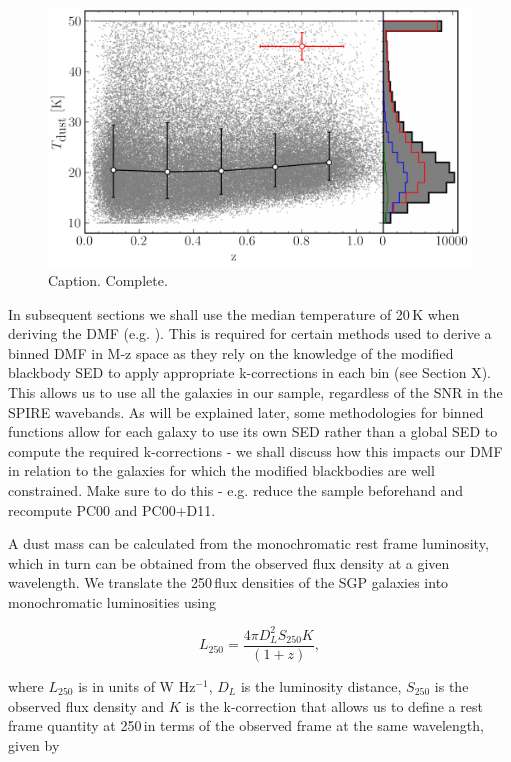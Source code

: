 \begin{figure}
	\centering
	\includegraphics[width=0.9\columnwidth]{Figures/dust_temperatures.pdf}
	\caption{Caption. {\color{red} Complete.}}
	\label{fig:dust_temperatures}
\end{figure}

In subsequent sections we shall use the median temperature of 20\,K when deriving the DMF (e.g. \citealt{Vlahakis_2005}). This is required for certain methods used to derive a binned DMF in M-z space as they rely on the knowledge of the modified blackbody SED to apply appropriate k-corrections in each bin (see Section {\color{red} X}). This allows us to use all the galaxies in our sample, regardless of the SNR in the SPIRE wavebands. As will be explained later, some methodologies for binned functions allow for each galaxy to use its own SED rather than a global SED to compute the required k-corrections - we shall discuss how this impacts our DMF in relation to the galaxies for which the modified blackbodies are well constrained. {\color{red} Make sure to do this - e.g. reduce the sample beforehand and recompute PC00 and PC00+D11.}

A dust mass can be calculated from the monochromatic rest frame luminosity, which in turn can be obtained from the observed flux density at a given wavelength. We translate the 250\,\micron flux densities of the SGP galaxies into monochromatic luminosities using

\begin{equation}
    L_{250} = \frac{4\pi D_L^2 S_{250}K}{(1+z)},
\label{eq:monohromatic_luminosities}
\end{equation}

where $L_{250}$ is in units of W Hz$^{-1}$, $D_L$ is the luminosity distance, $S_{250}$ is the observed flux density and $K$ is the k-correction that allows us to define a rest frame quantity at 250\,\micron in terms of the observed frame at the same wavelength, given by

